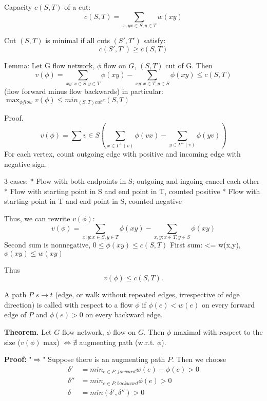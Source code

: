 Capacity $c(S,T)$ of a cut:
\[ c(S,T) = \sum_{x,y x\in S, y\in T} w(xy) \]

Cut $(S,T)$ is minimal if all cuts $(S',T')$ satisfy:
\[ c(S', T') \geq c(S,T) \]


Lemma: Let G flow network, $\phi$ flow on $G$, $(S,T)$ cut of G. Then
\[
v(\phi) = \sum_{xy: x\in S, y\in T} \phi(xy)
        - \sum_{xy: x\in T, y\in S} \phi(xy)
\leq c(S,T)
\]
(flow forward minus flow backwards)
in particular: $\max_{\phi flow} v(\phi)\leq min_{(S,T) cut} c(S,T)$

Proof.
\[
    v(\phi) = \sum{v\in S} (
        \sum_{x\in \Gamma^+(v)} \phi(vx)
      - \sum_{y\in \Gamma^-(v)} \phi(yv)
    )
\]
For each vertex, count outgoing edge with positive and incoming edge with negative sign.

3 cases:
* Flow with both endpoints in S; outgoing and ingoing cancel each other
* Flow with starting point in S and end point in T, counted positive
* Flow with starting point in T and end point in S, counted negative

Thus, we can rewrite $v(\phi)$:
\[
    v(\phi) = \sum_{x,y: x\in S, y\in T} \phi(xy)
            - \sum_{x,y: x\in T, y\in S} \phi(xy)
\]
Second sum is nonnegative, $0 \leq \phi (xy) \leq c(S,T)$
First sum: <= w(x,y), $\phi (xy) \leq w(xy)$

Thus
\[
    v(\phi) \leq c(S,T).
\]



\begin{definition}
A path $P$ $s\rightarrow t$ (edge, or walk without repeated edges, irrespective of edge direction) is called  with respect to a flow $\phi$ if $\phi(e) < w(e)$ on every forward edge of $P$ and $\phi(e) > 0$ on every backward edge.
\end{definition}

\textbf{Theorem.}
Let $G$ flow network, $\phi$ flow on $G$. Then $\phi$ maximal with respect to the size ($v(\phi)$ max) $\Leftrightarrow \nexists$ augmenting path (w.r.t. $\phi$).

\textbf{Proof:}
"$\Rightarrow$"
Suppose there is an augmenting path $P$. Then we choose
\begin{align*}
    \delta' &= min_{e \in P, forward} w(e) - \phi(e) > 0 \\
    \delta'' &= min_{e\in P, backward} \phi(e) > 0 \\
    \delta &= min(\delta', \delta'') > 0
\end{align*}

